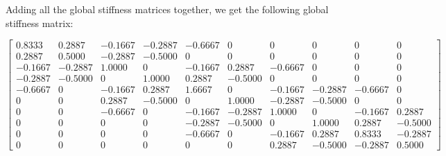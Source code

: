 \documentclass[8pt]{article}
\begin{document}
Adding all the global stiffness matrices together, we get the following global stiffness matrix:

\[ 
\begin{bmatrix}
  0.8333 & 0.2887 & -0.1667 & -0.2887 & -0.6667 & 0 & 0 & 0 & 0 & 0 \\
  0.2887 & 0.5000 & -0.2887 & -0.5000 & 0 & 0 & 0 & 0 & 0 & 0 \\
 -0.1667 & -0.2887 & 1.0000 & 0 & -0.1667 & 0.2887 & -0.6667 & 0 & 0 & 0 \\
 -0.2887 & -0.5000 & 0 & 1.0000 & 0.2887 & -0.5000 & 0 & 0 & 0 & 0 \\
 -0.6667 & 0 & -0.1667 & 0.2887 & 1.6667 & 0 & -0.1667 & -0.2887 & -0.6667 & 0 \\
  0 & 0 & 0.2887 & -0.5000 & 0 & 1.0000 & -0.2887 & -0.5000 & 0 & 0 \\
  0 & 0 & -0.6667 & 0 & -0.1667 & -0.2887 & 1.0000 & 0 & -0.1667 & 0.2887 \\
  0 & 0 & 0 & 0 & -0.2887 & -0.5000 & 0 & 1.0000 & 0.2887 & -0.5000 \\
  0 & 0 & 0 & 0 & -0.6667 & 0 & -0.1667 & 0.2887 & 0.8333 & -0.2887 \\
  0 & 0 & 0 & 0 & 0 & 0 & 0.2887 & -0.5000 & -0.2887 & 0.5000
\end{bmatrix}
\]





\end{document}
